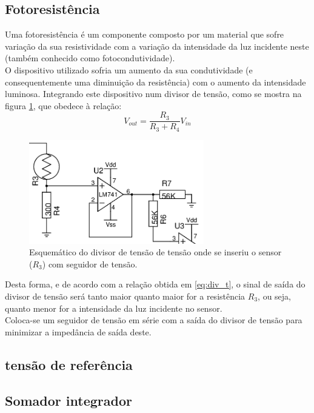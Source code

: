\documentclass[%
  reprint,
  nofootinbib,
  amsmath,amssymb,
  aps,
  10pt,
  a4paper
]{revtex4-1}
\begin{document}
\subsection{Fotoresistência}
Uma fotoresistência é um componente composto por um material que sofre variação da sua resistividade com a variação da intensidade da luz incidente neste (também conhecido como fotocondutividade).\\
O dispositivo utilizado sofria um aumento da sua condutividade (e consequentemente uma diminuição da resistência) com o aumento da intensidade luminosa. Integrando este dispositivo num divisor de tensão, como se mostra na figura \ref{fig:foto_res}, que obedece à relação:
\begin{equation}
V_{out}=\frac{R_3}{R_3+R_4}V_{in}
\label{eq:div_t}
\end{equation}
\begin{figure}
\includegraphics[width=3in]{../img/sensor.png}
\caption{Esquemático do divisor de tensão de tensão onde se inseriu o sensor ($R_3$) com seguidor de tensão.}
\label{fig:foto_res}
\end{figure}
Desta forma, e de acordo com a relação obtida em \ref{eq:div_t}, o sinal de saída do divisor de tensão será tanto maior quanto maior for a resistência $R_3$, ou seja, quanto menor for a intensidade da luz incidente no sensor.\\
Coloca-se um seguidor de tensão em série com a saída do divisor de tensão para minimizar a impedância de saída deste.


\subsection{tensão de referência}






\subsection{Somador integrador}
\end{document}
